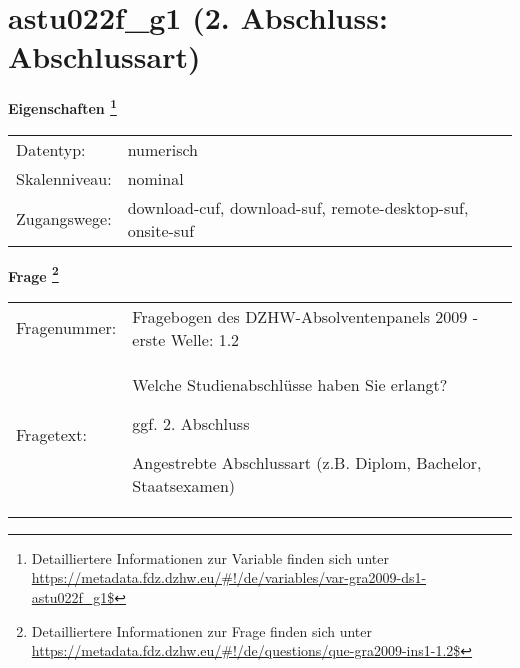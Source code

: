 
    \setcounter{footnote}{0}

    \vspace*{-1.8cm}
	\section{astu022f\_g1 (2. Abschluss: Abschlussart)}
	\label{section:astu022f_g1}



    \vspace*{0.5cm}
    \noindent\textbf{Eigenschaften
	\footnote{Detailliertere Informationen zur Variable finden sich unter
		\url{https://metadata.fdz.dzhw.eu/\#!/de/variables/var-gra2009-ds1-astu022f_g1$}}}\\
	\begin{tabularx}{\hsize}{@{}lX}
	Datentyp: & numerisch \\
	Skalenniveau: & nominal \\
	Zugangswege: &
	  download-cuf, 
	  download-suf, 
	  remote-desktop-suf, 
	  onsite-suf
 \\
    \end{tabularx}



				\vspace*{0.5cm}
                \noindent\textbf{Frage
	                \footnote{Detailliertere Informationen zur Frage finden sich unter
		              \url{https://metadata.fdz.dzhw.eu/\#!/de/questions/que-gra2009-ins1-1.2$}}}\\
				\begin{tabularx}{\hsize}{@{}lX}
					Fragenummer: &
					  Fragebogen des DZHW-Absolventenpanels 2009 - erste Welle:
					  1.2
 \\
					Fragetext: & Welche Studienabschlüsse haben Sie erlangt?\par  ggf. 2. Abschluss\par  Angestrebte Abschlussart (z.B. Diplom, Bachelor, Staatsexamen) \\
				\end{tabularx}





